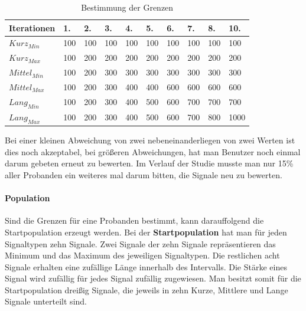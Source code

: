 \begin{table}[]
\centering
\caption{Bestimmung der Grenzen}
\label{bestimmunggrenzen}
\begin{tabular}{|l|l|l|l|l|l|l|l|l|l|}
\hline
Iterationen            & 1. & 2. & 3. & 4. & 5. & 6. & 7. & 8. & 10. \\ \hline
$Kurz_{Min}$   & 100          & 100          & 100          & 100          & 100          & 100          & 100          & 100          & 100           \\ \hline
$Kurz_{Max}$   & 100          & 200          & 200          & 200          & 200          & 200          & 200          & 200          & 200           \\ \hline
$Mittel_{Min}$ & 100          & 200          & 300          & 300          & 300          & 300          & 300          & 300          & 300           \\ \hline
$Mittel_{Max}$ & 100          & 200          & 300          & 400          & 400          & 600          & 600          & 600          & 600           \\ \hline
$Lang_{Min}$   & 100          & 200          & 300          & 400          & 500          & 600          & 700          & 700          & 700           \\ \hline
$Lang_{Max}$   & 100          & 200          & 300          & 400          & 500          & 600          & 700          & 800          & 1000          \\ \hline
\end{tabular}
\end{table}

Bei einer kleinen Abweichung von zwei nebeneinanderliegen von zwei Werten ist dies noch akzeptabel, bei gr{\"o}{\ss}eren Abweichungen, hat man Benutzer noch einmal darum gebeten erneut zu bewerten. Im Verlauf der Studie musste man nur 15\% aller Probanden ein weiteres mal darum bitten, die Signale neu zu bewerten. 

\paragraph{Population}

Sind die Grenzen f{\"u}r eine Probanden bestimmt, kann darauffolgend die Startpopulation erzeugt werden.
Bei der \textbf{Startpopulation} hat man f{\"u}r jeden Signaltypen zehn Signale. 
Zwei Signale der zehn Signale repr{\"a}sentieren das Minimum und das Maximum des jeweiligen Signaltypen.
Die restlichen acht Signale erhalten eine zuf{\"a}llige L{\"a}nge innerhalb des Intervalls. Die St{\"a}rke eines Signal wird zuf{\"a}llig f{\"u}r jedes Signal zuf{\"a}llig zugewiesen. 
Man besitzt somit f{\"u}r die Startpopulation drei{\ss}ig Signale, die jeweils in zehn Kurze, Mittlere und Lange Signale unterteilt sind. 


